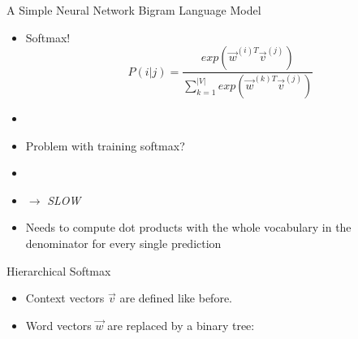 
\begin{frame}{A Simple Neural Network Bigram Language Model}

\vfill

\begin{itemize}
	\item Softmax!
	$$P(i|j) = \frac{exp(\vec w^{(i)T} \vec v^{(j)})}{\sum_{k=1}^{|V|} exp(\vec w^{(k)T} \vec v^{(j)})}$$
	\item[]
	\item \ques Problem with training softmax?
	\pause
	\item[]
	\item[] $\rightarrow$ \textit{SLOW}
	\item[] Needs to compute dot products with the whole vocabulary in the denominator for every single prediction
\end{itemize}

\vfill

\end{frame}


\begin{vbframe}{Hierarchical Softmax}

\vfill

\begin{itemize}
	\item Context vectors $\vec v$ are defined like before.
	\item Word vectors $\vec w$ are replaced by a binary tree:
\end{itemize}

\begin{center}
\end{center}

\vfill

\end{vbframe}


